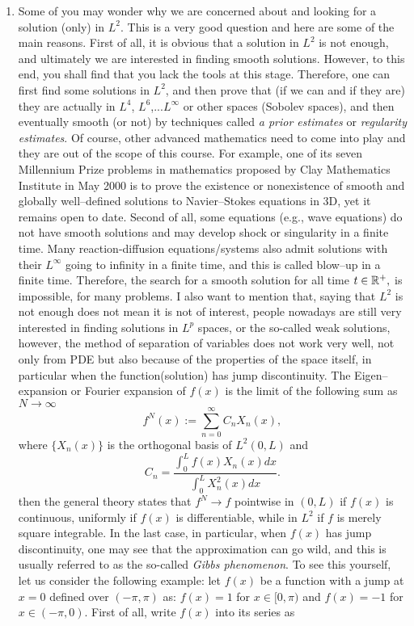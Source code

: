 \documentclass[6pt]{article}
\numberwithin{equation}{section}
\def\mathbb{\Bbb}
\begin{document}
\begin{enumerate}
\item   Some of you may wonder why we are concerned about and looking for a solution (only) in $L^2$.  This is a very good question and here are some of the main reasons.  First of all, it is obvious that a solution in $L^2$ is not enough, and ultimately we are interested in finding smooth solutions.  However, to this end, you shall find that you lack the tools at this stage.  Therefore, one can first find some solutions in $L^2$, and then prove that (if we can and if they are) they are actually in $L^4$, $L^6$,...$L^\infty$ or other spaces (Sobolev spaces), and then eventually smooth (or not) by techniques called \emph{a prior estimates} or \emph{regularity estimates}.  Of course, other advanced mathematics need to come into play and they are out of the scope of this course.  For example, one of its seven Millennium Prize problems in mathematics proposed by Clay Mathematics Institute in May 2000 is to prove the existence or nonexistence of smooth and globally well--defined solutions to Navier--Stokes equations in 3D, yet it remains open to date.  Second of all, some equations (e.g., wave equations) do not have smooth solutions and may develop shock or singularity in a finite time.  Many reaction-diffusion equations/systems also admit solutions with their $L^\infty$ going to infinity in a finite time, and this is called blow--up in a finite time.  Therefore, the search for a smooth solution for all time $t\in\mathbb R^+,$ is impossible, for many problems.  I also want to mention that, saying that $L^2$ is not enough does not mean it is not of interest, people nowadays are still very interested in finding solutions in $L^p$ spaces, or the so-called weak solutions, however, the method of separation of variables does not work very well, not only from PDE but also because of the properties of the space itself, in particular when the function(solution) has jump discontinuity.   The Eigen--expansion or Fourier expansion of $f(x)$ is the limit of the following sum as $N\rightarrow \infty$
    \[f^N(x):=\sum_{n=0}^\infty C_n X_n(x),\]
    where $\{X_n(x)\}$ is the orthogonal basis of $L^2(0,L)$ and
    \[C_n=\frac{\int_0^L f(x)X_n(x)dx}{\int_0^L X_n^2(x) dx}.\]
  then the general theory states that $f^N\rightarrow f$ pointwise in $(0,L)$ if $f(x)$ is continuous, uniformly if $f(x)$ is differentiable, while in $L^2$ if $f$ is merely square integrable.  In the last case, in particular, when $f(x)$ has jump discontinuity, one may see that the approximation can go wild, and this is usually referred to as the so-called \emph{Gibbs phenomenon}.  To see this yourself, let us consider the following example: let $f(x)$ be a function with a jump at $x=0$ defined over $(-\pi,\pi)$ as: $f(x)=1$ for $x\in[0,\pi)$ and $f(x)=-1$ for $x\in(-\pi,0)$.  First of all, write $f(x)$ into its series as

\end{enumerate}
\end{document}
